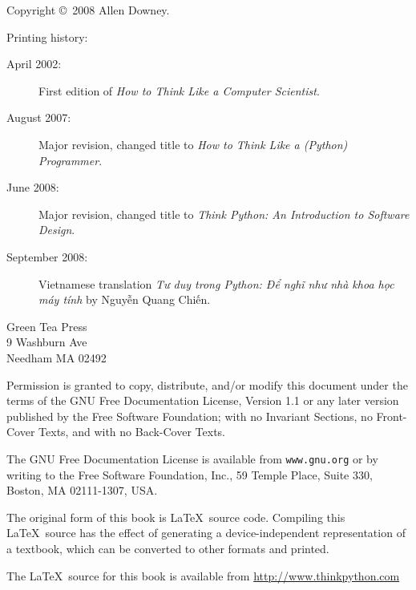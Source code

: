 \documentclass[11pt]{book}
\begin{document}
\pagebreak
\thispagestyle{empty}

{\small
Copyright \copyright ~2008 Allen Downey.


Printing history:

\begin{description}

\item[April 2002:] First edition of {\em How to Think Like
a Computer Scientist}.

\item[August 2007:] Major revision, changed title to
{\em How to Think Like a (Python) Programmer}.

\item[June 2008:] Major revision, changed title to
{\em Think Python: An Introduction to Software Design}.

\item[September 2008:] Vietnamese translation {\em Tư duy
trong Python: Để nghĩ như nhà khoa học máy tính} by Nguyễn Quang Chiến.

\end{description}

\vspace{0.2in}

\begin{flushleft}
Green Tea Press       \\
9 Washburn Ave \\
Needham MA 02492
\end{flushleft}

Permission is granted to copy, distribute, and/or modify this document
under the terms of the GNU Free Documentation License, Version 1.1 or
any later version published by the Free Software Foundation; with no
Invariant Sections, no Front-Cover Texts, and with no Back-Cover Texts.

The GNU Free Documentation License is available from {\tt www.gnu.org}
or by writing to the Free Software Foundation, Inc., 59 Temple Place,
Suite 330, Boston, MA 02111-1307, USA.

The original form of this book is \LaTeX\ source code.  Compiling this
\LaTeX\ source has the effect of generating a device-independent
representation of a textbook, which can be converted to other formats
and printed.

The \LaTeX\ source for this book is available from
\url{http://www.thinkpython.com}

\vspace{0.2in}

} %
\end{document}
